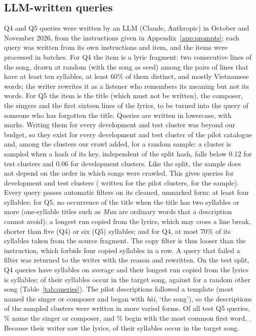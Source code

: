 \documentclass[11pt]{article}
\newcommand{\vi}[1]{\textit{#1}}          %
\newcommand{\gloss}[1]{`#1'}
\newcommand{\Qfour}{Q4\xspace}
\newcommand{\Qfive}{Q5\xspace}
\begin{document}
\subsection{LLM-written queries}\label{sec:llm}
\Qfour{} and \Qfive{} queries were written by an LLM (Claude, Anthropic) in October and November 2026, from
the instructions given in Appendix~\ref{app:prompts}; each query was written from its own instructions and
item, and the items were processed in batches. For \Qfour{} the item is a lyric fragment: two consecutive
lines of the song, drawn at random (with the song as seed) among the pairs of lines that have at least ten
syllables, at least 60\% of them distinct, and mostly Vietnamese words; the writer rewrites it as a listener
who remembers its meaning but not its words. For \Qfive{} the item is the title (which must not be written),
the composer, the singers and the first sixteen lines of the lyrics, to be turned into the query of someone
who has forgotten the title. Queries are written in lowercase, with marks. Writing them for every development
and test cluster was beyond our budget, so they exist for every development and test cluster of the pilot
catalogue and, among the clusters our crawl added, for a random sample: a cluster is sampled when a hash of
its key, independent of the split hash, falls below 0.12 for test clusters and 0.06 for development
clusters. Like the split, the sample does not depend on the order in which songs were crawled. This gives
\NLLMQueries{} queries for \NLLMClustersDev{} development and \NLLMClustersTest{} test clusters
(\NLLMPilot{} written for the pilot clusters, \NLLMSampled{} for the sample). Every query passes automatic
filters on its cleaned, unmarked form: at least four syllables; for \Qfive{}, no occurrence of the title
when the title has two syllables or more (one-syllable titles such as \vi{Mưa} are ordinary words that a
description cannot avoid); a longest run copied from the lyrics, which may cross a line break, shorter than
five (\Qfour) or six (\Qfive) syllables; and for \Qfour{}, at most 70\% of its syllables taken from the
source fragment. The copy filter is thus looser than the instruction, which forbids four copied syllables in
a row. A query that failed a filter was returned to the writer with the reason and rewritten. On the test
split, \Qfour{} queries have \LenFour{} syllables on average and their longest run copied from the lyrics is
\RunFour{} syllables; \OverlapFour{} of their syllables occur in the target song, against \RandOverlapFour{}
for a random other song (Table~\ref{tab:queries}). The pilot descriptions followed a template (most named the
singer or composer and began with \vi{bài}, \gloss{the song}), so the descriptions of the sampled clusters
were written in more varied forms. Of all test \Qfive{} queries, \QfiveArtistShare\% name the singer or
composer, and \QfiveFirstShare\% begin with the most common first word, \vi{\QfiveFirstWord}. Because their
writer saw the lyrics, \OverlapFive{} of their syllables occur in the target song.
\end{document}
